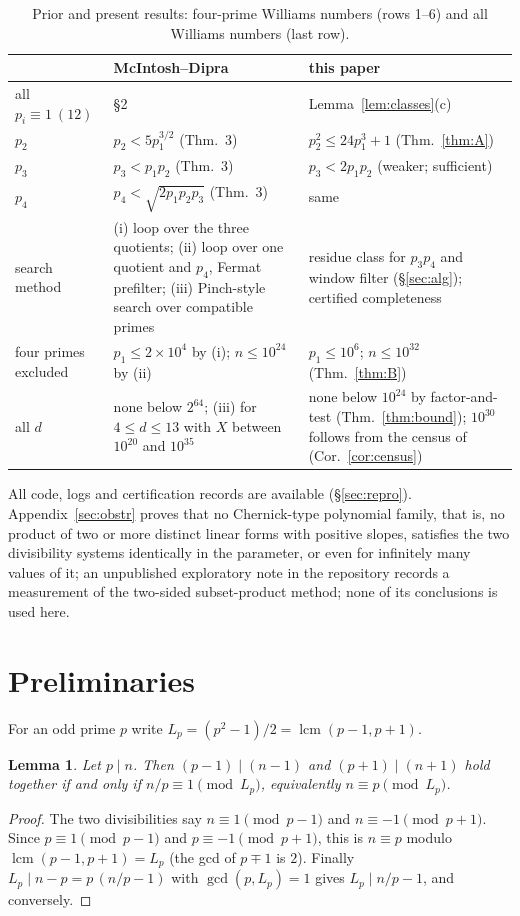 \documentclass[11pt]{amsart}
\newtheorem{lemma}[theorem]{Lemma}
\theoremstyle{definition}
\theoremstyle{remark}
\providecommand{\lcm}{\operatorname{lcm}}
\begin{document}
\begin{table}[h]
\centering\small
\begin{tabular}{p{2.6cm}p{5.6cm}p{5.6cm}}
\toprule
 & McIntosh--Dipra \cite{MD15} & this paper\\
\midrule
all $p_i\equiv1\ (12)$ & \S2 & Lemma~\ref{lem:classes}(c)\\
$p_2$ & $p_2<5p_1^{3/2}$ (Thm.~3) & $p_2^2\le24p_1^3+1$ (Thm.~\ref{thm:A})\\
$p_3$ & $p_3<p_1p_2$ (Thm.~3) & $p_3<2p_1p_2$ (weaker; sufficient)\\
$p_4$ & $p_4<\sqrt{2p_1p_2p_3}$ (Thm.~3) & same\\
search method & (i) loop over the three quotients; (ii) loop over one quotient and $p_4$, Fermat prefilter; (iii) Pinch-style search over compatible primes & residue class for $p_3p_4$ and window filter (\S\ref{sec:alg}); certified completeness\\
four primes excluded & $p_1\le2\times10^4$ by (i); $n\le10^{24}$ by (ii) & $p_1\le10^{6}$; $n\le10^{32}$ (Thm.~\ref{thm:B})\\
all $d$ & none below $2^{64}$; (iii) for $4\le d\le13$ with $X$ between $10^{20}$ and $10^{35}$ & none below $10^{24}$ by factor-and-test (Thm.~\ref{thm:bound}); $10^{30}$ follows from the census of \cite{Pud30} (Cor.~\ref{cor:census})\\
\bottomrule
\end{tabular}
\caption{Prior and present results: four-prime Williams numbers (rows 1--6) and all Williams numbers (last row).}\label{tab:compare}
\end{table}

All code, logs and certification records are available (\S\ref{sec:repro}). Appendix~\ref{sec:obstr} proves that no Chernick-type polynomial family, that is, no product of two or more distinct linear forms with positive slopes, satisfies the two divisibility systems identically in the parameter, or even for infinitely many values of it; an unpublished exploratory note in the repository \cite{Supp} records a measurement of the two-sided subset-product method; none of its conclusions is used here.

\section{Preliminaries}\label{sec:prelim}

For an odd prime $p$ write $L_p=(p^2-1)/2=\lcm(p-1,p+1)$.

\begin{lemma}\label{lem:quotient}
Let $p\mid n$. Then $(p-1)\mid(n-1)$ and $(p+1)\mid(n+1)$ hold together if and only if $n/p\equiv1\pmod{L_p}$, equivalently $n\equiv p\pmod{L_p}$.
\end{lemma}
\begin{proof}
The two divisibilities say $n\equiv1\pmod{p-1}$ and $n\equiv-1\pmod{p+1}$. Since $p\equiv1\pmod{p-1}$ and $p\equiv-1\pmod{p+1}$, this is $n\equiv p$ modulo $\lcm(p-1,p+1)=L_p$ (the gcd of $p\mp1$ is $2$). Finally $L_p\mid n-p=p\,(n/p-1)$ with $\gcd(p,L_p)=1$ gives $L_p\mid n/p-1$, and conversely.
\end{proof}
\end{document}

